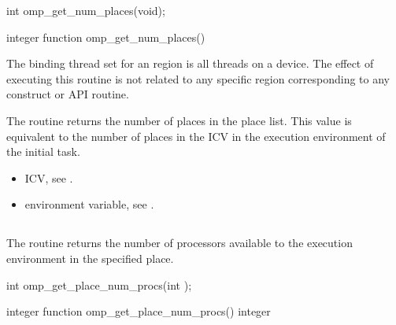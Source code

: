 \format
\ccppspecificstart
\begin{boxedcode}
int omp\_get\_num\_places(void);
\end{boxedcode}
\ccppspecificend

\fortranspecificstart
\begin{boxedcode}
integer function omp\_get\_num\_places()
\end{boxedcode}
\fortranspecificend

\binding
The binding thread set for an   region is all threads on a device. The effect of executing this routine is not related to any specific region corresponding to any construct or API routine.

\effect

The  routine returns the number of places in the place list. This value is equivalent to the number of places in the   ICV in the execution environment of the initial task.

\crossreferences
\begin{itemize}
\item {} ICV, see 
.

\item {} environment variable, see 
.
\end{itemize}





\subsection{}
\label{subsec:omp_get_place_num_procs}

\summary
The   routine returns the number of processors available to the execution environment in the specified place.

\format
\ccppspecificstart
\begin{boxedcode}
int omp\_get\_place\_num\_procs(int );
\end{boxedcode}
\ccppspecificend

\fortranspecificstart
\begin{boxedcode}
integer function omp\_get\_place\_num\_procs()
integer 
\end{boxedcode}
\fortranspecificend

